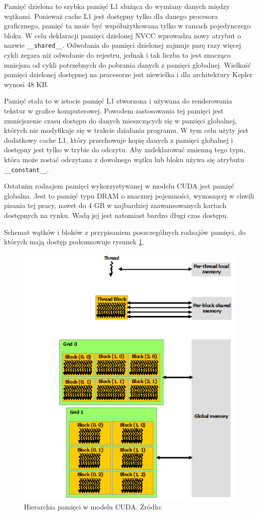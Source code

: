 Pamięć dzielona to szybka pamięć L1 służąca do wymiany danych między wątkami.
Ponieważ cache L1 jest dostępny tylko dla danego procesora graficznego,
  pamięć ta może być współużytkowana tylko w ramach pojedynczego bloku. W celu
  deklaracji pamięci dzielonej NVCC wprowadza nowy atrybut o nazwie
  \texttt{\_\_shared\_\_}. Odwołania do pamięci dzielonej zajmuje parę razy
  więcej cykli zegara niż odwołanie do rejestru, jednak i tak liczba ta jest
  znacząco mniejsza od cykli potrzebnych do pobrania danych z pamięci globalnej.
  Wielkość pamięci dzielonej dostępnej na procesorze jest niewielka i dla
  architektury Kepler wynosi 48 KB.

Pamięć stała to w istocie pamięć L1 stworzona i używana do renderowania tekstur 
w grafice komputerowej. Powodem zastosowania tej pamięci jest zmniejszenie czasu
dostępu do danych mieszczących się w pamięci globalnej, których nie modyfikuje się w trakcie działania programu.
W tym celu użyty jest dodatkowy cache L1, który przechowuje kopię danych 
z pamięci globalnej i dostępny jest tylko w trybie do odczytu.
Aby zadeklarować zmienną tego typu, która może zostać odczytana z dowolnego
wątku lub bloku używa się atrybutu \texttt{\_\_constant\_\_}.

Ostatnim rodzajem pamięci wykorzystywanej w modelu CUDA jest pamięć globalna.
Jest to pamięć typu DRAM o znacznej pojemności, wynoszącej w chwili pisania tej
pracy, nawet do 4 GB w najbardziej zaawansowanych kartach dostępnych na rynku. 
Wadą jej jest natomiast bardzo długi czas dostępu.

Schemat wątków i bloków z przypisaniem poszczególnych rodzajów pamięci, do których
mają dostęp podsumowuje rysunek \ref{hier}.

\begin{figure}[H]
\centering
\label{hier}
\includegraphics[scale=0.6]{images/memory-hierarchy.png}
\caption{Hierarchia pamięci w modelu CUDA. Źródło: \cite{Nvi11b}}
\end{figure}

